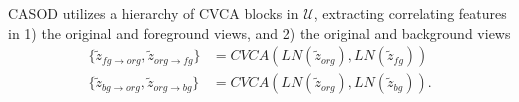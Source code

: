 CASOD utilizes a hierarchy of CVCA blocks in $\mathcal{U}$, extracting correlating features in 1) the original and foreground views, and 2) the original and background views
\begin{equation}
\begin{split}
	\{\tilde{z}_{fg \rightarrow org}, \tilde{z}_{org \rightarrow fg}\} & = CVCA(LN(\tilde{z}_{org}), LN(\tilde{z}_{fg}))  \\
	\{\tilde{z}_{bg \rightarrow org}, \tilde{z}_{org \rightarrow bg}\} & = CVCA(LN(\tilde{z}_{org}), LN(\tilde{z}_{bg})).
\end{split}
\end{equation}
